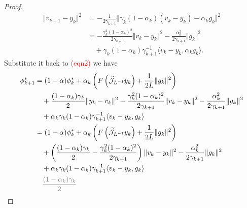 \documentclass[12pt]{article}
\begin{document}
\begin{proof}
\begin{align*}
            \Vert v_{k + 1} - y_k\Vert^2
            &= 
            - \frac{1}{2\gamma_{k + 1}}
            \Vert 
                \gamma_k(1 - \alpha_k)(v_k - y_k) - \alpha_k g_k
            \Vert^2
            \\
            &= 
            -\frac{\gamma_k^2 (1 - \alpha_k)^2}{2 \gamma_{k + 1}} 
            \Vert v_k - y_k\Vert^2 - 
            \frac{\alpha_k^2}{2 \gamma_{k + 1}} \Vert g_k\Vert^2
            \\&\quad 
                + 
                \gamma_k(1 - \alpha_k)\gamma_{k + 1}^{-1} \langle v_k - y_k, \alpha_k g_k\rangle. 
        \end{align*}
        Substitute it back to \textcolor{red}{(eqn2)} we have 
        \begin{align*}
            \phi_{k + 1}^* &= 
            (1 - \alpha)\phi_k^* + 
            \alpha_k
            \left(
                F\left(\widetilde{\mathcal J}_{L^{-1}} y_k\right) + 
                \frac{1}{2L}\Vert g_k\Vert^2
            \right)
            \\
            &\quad 
            + \frac{(1 - \alpha_k)\gamma_k}{2}\Vert y_k - v_k\Vert^2
            - \frac{\gamma_k^2(1 - \alpha_k)^2}{2\gamma_{k + 1}}\Vert v_k - y_k\Vert^2
            - \frac{\alpha_k^2}{2\gamma_{k + 1}}\Vert g_k\Vert^2
            \\
            &\quad 
            + \alpha_k\gamma_k(1 - \alpha_k)\gamma_{k + 1}^{-1}\langle v_k -y_k, g_k\rangle
            \\
            &= 
                (1 - \alpha)\phi_k^* + 
                \alpha_k
                \left(
                    F\left(\widetilde{\mathcal J}_{L^{-1}} y_k\right) + 
                    \frac{1}{2L}\Vert g_k\Vert^2
                \right)
                \\
                &\quad 
                + 
                \left(
                    \frac{(1 - \alpha_k)\gamma_k}{2}
                    - 
                    \frac{\gamma_k^2(1 - \alpha_k)^2}{2\gamma_{k + 1}}
                \right)
                \Vert v_k - y_k\Vert^2
                - \frac{\alpha_k^2}{2\gamma_{k + 1}}\Vert g_k\Vert^2
                \\
                &\quad 
                + \alpha_k\gamma_k(1 - \alpha_k)\gamma_{k + 1}^{-1}\langle v_k -y_k, g_k\rangle
            \\
            & \quad 
            \textcolor{gray}{  
                \begin{aligned}
                    \frac{(1 - \alpha_k)\gamma_k}{2}

\end{aligned}}
\end{align*}
\end{proof}
\end{document}

